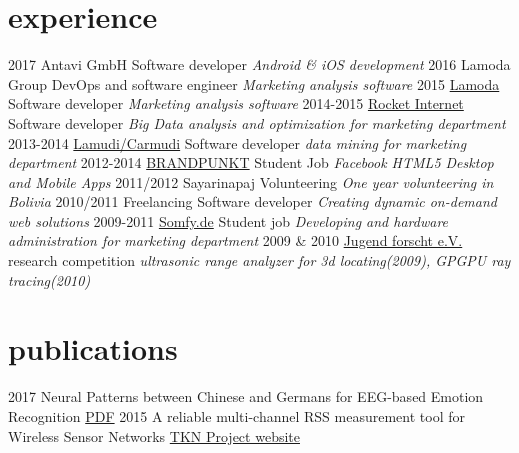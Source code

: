\documentclass[]{friggeri-cv}
\begin{document}
\section{experience}

\begin{entrylist}
  \entry
    {2017}
    {{Antavi GmbH}}
    {Software developer}
    {\emph{Android \& iOS development}}
  \entry
    {2016}
    {{Lamoda Group}}
    {DevOps and software engineer}
    {\emph{Marketing analysis software}}
  \entry
    {2015}
    {\href{http://www.lamoda.ru/}{Lamoda}}
    {Software developer}
    {\emph{Marketing analysis software}}
  \entry
    {2014-2015}
    {\href{http://www.rocket-internet.com/}{Rocket Internet}}
    {Software developer}
    {\emph{Big Data analysis and optimization for marketing department}}
  \entry
    {2013-2014}
    {\href{http://www.lamudi.com/}{Lamudi/Carmudi}}
    {Software developer}
    {\emph{data mining for marketing department}}
  \entry
    {2012-2014}
    {\href{http://brandpunkt.com}{BRANDPUNKT}}
    {Student Job}
    {\emph{Facebook HTML5 Desktop and Mobile Apps}}
  \entry
    {2011/2012}
    {Sayarinapaj}
    {Volunteering}
    {\emph{One year volunteering in Bolivia}}
  \entry
    {2010/2011}
    {Freelancing}
    {Software developer}
    {\emph{Creating dynamic on-demand web solutions}}
  \entry
    {2009-2011}
    {\href{http://www.somfy.de}{Somfy.de}}
    {Student job}
    {\emph{Developing and hardware administration for marketing department }}
  \entry
    {2009 \& 2010}
    {\href{http://jugend-forscht.de}{Jugend forscht e.V.}}
    {research competition}
    {\emph{ultrasonic range analyzer for 3d locating(2009), GPGPU ray tracing(2010)}}
\end{entrylist}

%

\section{publications}

\begin{entrylist}
  \entry
    {2017}
    {Neural Patterns between Chinese and Germans for EEG-based Emotion Recognition}
    {\href{http://ieeexplore.ieee.org/abstract/document/8008300/?reload=true}{PDF}}
    {}
  \entry
    {2015}
    {A reliable multi-channel RSS measurement tool for Wireless Sensor Networks}
    {\href{http://www.tkn.tu-berlin.de/index.php?id=159554}{TKN Project website}}
    {}
\end{entrylist}
\end{document}
